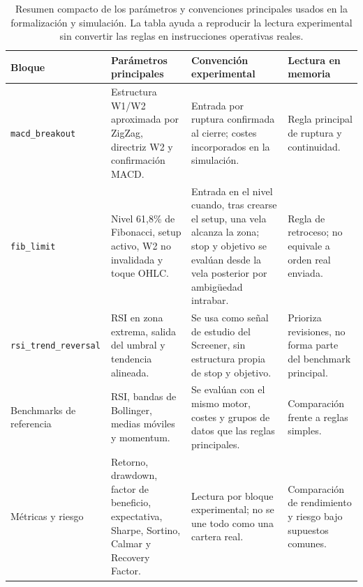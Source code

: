 \begin{table}[H]
\centering
\scriptsize
\setlength{\tabcolsep}{3pt}
\renewcommand{\arraystretch}{1.12}
\begin{tabular}{p{}p{}p{}p{}}
\hline
\textbf{Bloque} & \textbf{Par\'ametros principales} & \textbf{Convenci\'on experimental} & \textbf{Lectura en memoria} \\
\hline
\texttt{macd\_breakout} & Estructura W1/W2 aproximada por ZigZag, directriz W2 y confirmaci\'on MACD. & Entrada por ruptura confirmada al cierre; costes incorporados en la simulaci\'on. & Regla principal de ruptura y continuidad. \\
\texttt{fib\_limit} & Nivel 61,8\% de Fibonacci, setup activo, W2 no invalidada y toque OHLC. & Entrada en el nivel cuando, tras crearse el setup, una vela alcanza la zona; stop y objetivo se eval\'uan desde la vela posterior por ambig\"uedad intrabar. & Regla de retroceso; no equivale a orden real enviada. \\
\texttt{rsi\_trend\_reversal} & RSI en zona extrema, salida del umbral y tendencia alineada. & Se usa como se\~nal de estudio del Screener, sin estructura propia de stop y objetivo. & Prioriza revisiones, no forma parte del benchmark principal. \\
Benchmarks de referencia & RSI, bandas de Bollinger, medias m\'oviles y momentum. & Se eval\'uan con el mismo motor, costes y grupos de datos que las reglas principales. & Comparaci\'on frente a reglas simples. \\
M\'etricas y riesgo & Retorno, drawdown, factor de beneficio, expectativa, Sharpe, Sortino, Calmar y Recovery Factor. & Lectura por bloque experimental; no se une todo como una cartera real. & Comparaci\'on de rendimiento y riesgo bajo supuestos comunes. \\
\hline
\end{tabular}
\caption[Par\'ametros y convenciones principales de simulaci\'on]{Resumen compacto de los par\'ametros y convenciones principales usados en la formalizaci\'on y simulaci\'on. La tabla ayuda a reproducir la lectura experimental sin convertir las reglas en instrucciones operativas reales.}
\label{tab:parametros-reglas-simulacion}
\end{table}
